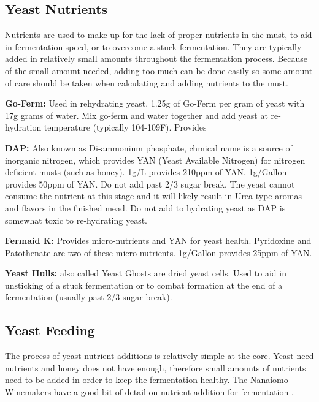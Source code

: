 \documentclass{article}
\begin{document}
 \subsection{Yeast Nutrients}
  Nutrients are used to make up for the lack of proper nutrients in the must, to aid in fermentation speed, or to overcome a stuck fermentation. 
  They are typically added in relatively small amounts throughout the fermentation process. Because of the small amount needed, adding too 
  much can be done easily so some amount of care should be taken when calculating and adding nutrients to the must.

  \textbf{Go-Ferm:} Used in rehydrating yeast. 1.25g of Go-Ferm per gram of yeast with 17g grams of water. Mix go-ferm and water together 
  and add yeast at re-hydration temperature (typically 104-109F). Provides 

  \textbf{DAP:} Also known as Di-ammonium phosphate, chmical name  is a source of inorganic nitrogen, which provides YAN 
  (Yeast Available Nitrogen) for nitrogen deficient musts (such as honey). 1g/L provides 210ppm of YAN. 1g/Gallon provides 50ppm of YAN. 
  Do not add past 2/3 sugar break. The yeast cannot consume the nutrient at this stage and it will likely result in Urea type aromas and 
  flavors in the finished mead. Do not add to hydrating yeast as DAP is somewhat toxic to re-hydrating yeast.

  \textbf{Fermaid K:} Provides micro-nutrients and YAN for yeast health. Pyridoxine and Patothenate are two of these micro-nutrients. 
  1g/Gallon provides 25ppm of YAN.

  \textbf{Yeast Hulls:} also called Yeast Ghosts are dried yeast cells. Used to aid in unsticking of a stuck fermentation or to combat 
   formation at the end of a fermentation (usually past 2/3 sugar break).
  
 \subsection{Yeast Feeding}
  The process of yeast nutrient additions is relatively simple at the core. Yeast need nutrients and honey does not have enough, therefore small amounts
  of nutrients need to be added in order to keep the fermentation healthy. The Nanaiomo Winemakers have a good bit of detail on nutrient addition for fermentation
  \cite{nanaiomo-fermentation}. 
\end{document}
